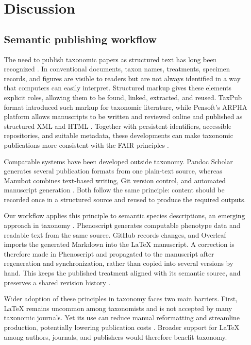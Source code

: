 \documentclass[fleqn,10pt,lineno]{wlpeerj}
\begin{document}
\section*{Discussion}


\subsection*{Semantic publishing workflow}

The need to publish taxonomic papers as structured text has long been recognized \citep{penev2010semantic, penev2011xml, miller2012cybertaxonomic}. In conventional documents, taxon names, treatments, specimen records, and figures are visible to readers but are not always identified in a way that computers can easily interpret. Structured markup gives these elements explicit roles, allowing them to be found, linked, extracted, and reused. TaxPub format introduced such markup for taxonomic literature, while Pensoft's ARPHA platform allows manuscripts to be written and reviewed online and published as structured XML and HTML  \citep{penev2011xml, stoev2018arpha}. Together with persistent identifiers, accessible repositories, and suitable metadata, these developments can make taxonomic publications more consistent with the FAIR principles \citep{wilkinson2016fair}.

Comparable systems have been developed outside taxonomy. Pandoc Scholar generates several publication formats from one plain-text source, whereas Manubot combines text-based writing, Git version control, and automated manuscript generation \citep{krewinkel2017formatting, himmelstein2020open}. Both follow the same principle: content should be recorded once in a structured source and reused to produce the required outputs.

Our workflow applies this principle to semantic species descriptions, an emerging approach in taxonomy \citep{balhoff2013semantic, deans2015phenotypes, montanaro2024computable}. Phenoscript generates computable phenotype data and readable text from the same source. GitHub records changes, and Overleaf imports the generated Markdown into the \LaTeX{} manuscript. A correction is therefore made in Phenoscript and propagated to the manuscript after regeneration and synchronization, rather than copied into several versions by hand. This  keeps the published treatment aligned with its semantic source, and preserves a shared revision history \citep{ram2013git, braga2023github}.


Wider adoption of these principles in taxonomy faces two main barriers. First, \LaTeX{} remains uncommon among taxonomists and is not accepted by many taxonomic journals. Yet its use can reduce manual reformatting and streamline production, potentially lowering publication costs \citep{bar2021reproducible, krewinkel2017formatting}. Broader support for \LaTeX{} among authors, journals, and publishers would therefore benefit taxonomy.
\end{document}
